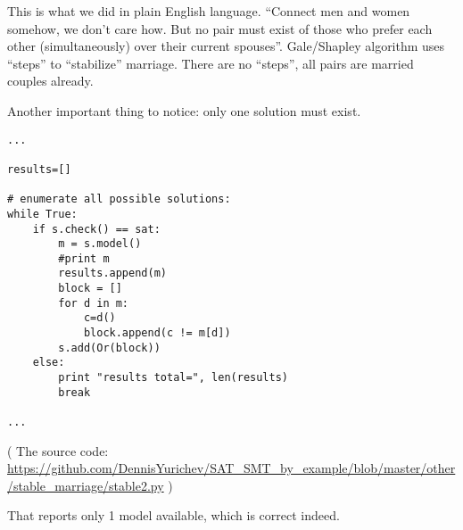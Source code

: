 This is what we did in plain English language.
``Connect men and women somehow, we don't care how.
But no pair must exist of those who prefer each other (simultaneously) over their current spouses''.
Gale/Shapley algorithm uses ``steps'' to ``stabilize'' marriage.
There are no ``steps'', all pairs are married couples already.

Another important thing to notice: only one solution must exist.

\begin{lstlisting}
...

results=[]

# enumerate all possible solutions:
while True:
    if s.check() == sat:
        m = s.model()
        #print m
        results.append(m)
        block = []
        for d in m:
            c=d()
            block.append(c != m[d])
        s.add(Or(block))
    else:
        print "results total=", len(results)
        break

...
\end{lstlisting}

( The source code: \url{https://github.com/DennisYurichev/SAT_SMT_by_example/blob/master/other/stable_marriage/stable2.py} )

That reports only 1 model available, which is correct indeed.

